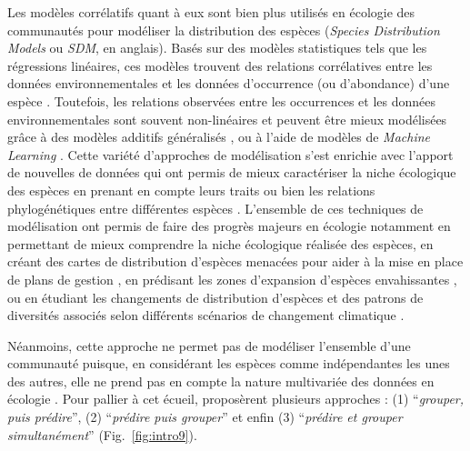 \begin{refsection}
Les modèles corrélatifs quant à eux sont bien plus utilisés en écologie
des communautés pour modéliser la distribution des espèces
(\emph{Species Distribution Models} ou \emph{SDM}, en anglais). Basés
sur des modèles statistiques tels que les régressions linéaires, ces
modèles trouvent des relations corrélatives entre les données
environnementales et les données d'occurrence (ou d'abondance) d'une
espèce \autocite{Guisan_2017}. Toutefois, les relations observées entre
les occurrences et les données environnementales sont souvent
non-linéaires et peuvent être mieux modélisées grâce à des modèles
additifs généralisés \autocite{Guisan_2002}, ou à l'aide de modèles de
\emph{Machine Learning} \autocite{Elith_2006}. Cette variété d'approches
de modélisation s'est enrichie avec l'apport de nouvelles de données qui
ont permis de mieux caractériser la niche écologique des espèces en
prenant en compte leurs traits \autocite{Pollock_2012} ou bien les
relations phylogénétiques entre différentes espèces
\autocite{Ives_2011}. L'ensemble de ces techniques de modélisation ont
permis de faire des progrès majeurs en écologie notamment en permettant
de mieux comprendre la niche écologique réalisée des espèces, en créant
des cartes de distribution d'espèces menacées pour aider à la mise en
place de plans de gestion \autocite{Franklin_2013}, en prédisant les
zones d'expansion d'espèces envahissantes \autocite{Mainali_2015}, ou en
étudiant les changements de distribution d'espèces et des patrons de
diversités associés selon différents scénarios de changement climatique
\autocite{Araujo_2019}.

Néanmoins, cette approche ne permet pas de modéliser l'ensemble d'une
communauté puisque, en considérant les espèces comme indépendantes les
unes des autres, elle ne prend pas en compte la nature multivariée des
données en écologie \autocites[ ]{Warton_2015}{Ovaskainen_2017a}. Pour
pallier à cet écueil, \textcite{Ferrier_2006} proposèrent plusieurs
approches : (1) ``\emph{grouper, puis prédire}'', (2) ``\emph{prédire
puis grouper}'' et enfin (3) ``\emph{prédire et grouper simultanément}''
(Fig.~\ref{fig:intro9}).


\end{refsection}
